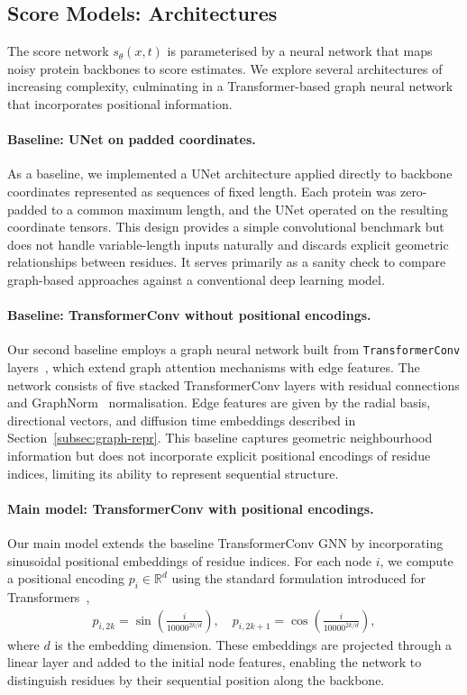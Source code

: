 \documentclass[a4paper,12pt]{article}
\begin{document}
\subsection{Score Models: Architectures}\label{subsec:architectures}
The score network \(s_\theta(x,t)\) is parameterised by a neural network that maps noisy protein backbones to score estimates. We explore several architectures of increasing complexity, culminating in a Transformer-based graph neural network that incorporates positional information.

\paragraph{Baseline: UNet on padded coordinates.}
As a baseline, we implemented a UNet architecture applied directly to backbone coordinates represented as sequences of fixed length. Each protein was zero-padded to a common maximum length, and the UNet operated on the resulting coordinate tensors. This design provides a simple convolutional benchmark but does not handle variable-length inputs naturally and discards explicit geometric relationships between residues. It serves primarily as a sanity check to compare graph-based approaches against a conventional deep learning model.

\paragraph{Baseline: TransformerConv without positional encodings.}
Our second baseline employs a graph neural network built from \texttt{TransformerConv} layers~\cite{PyG1.0,PyG2.0}, which extend graph attention mechanisms with edge features. 
The network consists of five stacked TransformerConv layers with residual connections and GraphNorm~\cite{cai2021GraphNormPrincipledApproach} normalisation. 
Edge features are given by the radial basis, directional vectors, and diffusion time embeddings described in Section~\ref{subsec:graph-repr}. 
This baseline captures geometric neighbourhood information but does not incorporate explicit positional encodings of residue indices, limiting its ability to represent sequential structure.

\paragraph{Main model: TransformerConv with positional encodings.}
Our main model extends the baseline TransformerConv GNN by incorporating sinusoidal positional embeddings of residue indices. 
For each node \(i\), we compute a positional encoding \(p_i \in \mathbb{R}^d\) using the standard formulation introduced for Transformers~\cite{vaswaniAttentionAllYou2017}, 
\begin{align*}
    p_{i,2k} = \sin\!\left(\frac{i}{10000^{2k/d}}\right), \quad p_{i,2k+1} = \cos\!\left(\frac{i}{10000^{2k/d}}\right),
\end{align*}
where \(d\) is the embedding dimension. These embeddings are projected through a linear layer and added to the initial node features, enabling the network to distinguish residues by their sequential position along the backbone.
\end{document}

